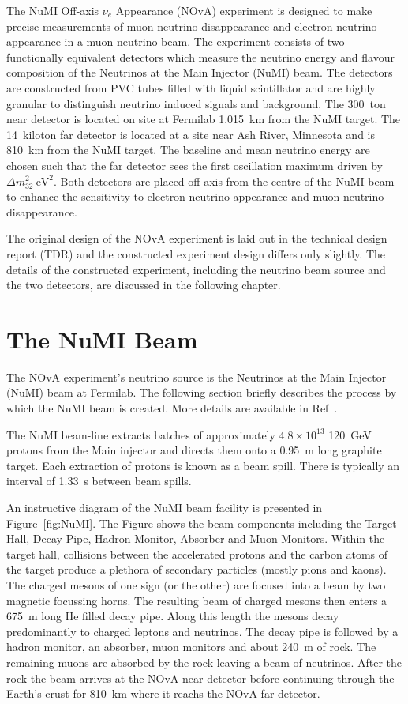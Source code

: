 
The NuMI Off-axis $\nu_e$ Appearance (NOvA) experiment 
is designed to make precise measurements of muon neutrino
disappearance and electron neutrino appearance in a muon neutrino
beam.  
The experiment consists of two functionally equivalent
detectors which measure the neutrino energy and flavour composition of 
the Neutrinos at the Main Injector (NuMI) beam. 
The detectors are constructed from PVC tubes filled with liquid
scintillator and are highly granular to distinguish neutrino induced
signals and background.
The 300~ton near detector is located on site at Fermilab 1.015~km  
from the NuMI target. The 14~kiloton far detector is located at a site
near Ash River, Minnesota and is 810~km from the NuMI target. 
The baseline and mean neutrino energy are chosen such that the far
detector sees the first oscillation maximum driven by $\Delta
m_{32}^2~\text{eV}^2$. 
Both detectors are placed off-axis from the centre
of the NuMI beam to enhance the sensitivity to electron neutrino
appearance and muon neutrino disappearance.

The original design of the NOvA experiment is laid out in the
technical design report (TDR) \cite{TDR} and the constructed experiment
design differs only slightly. The details
of the constructed experiment, including the neutrino beam source and
the two detectors, are discussed in the following chapter.


\section{The NuMI Beam}

The NOvA experiment's neutrino source is the Neutrinos at
the Main Injector (NuMI) beam at Fermilab. The following section
briefly describes the process by which the NuMI beam is
created. More details are available in Ref~\cite{NuMI}.

The NuMI beam-line extracts batches of approximately $4.8 \times
10^{13}$ 120~GeV protons from the Main
injector and directs them onto a 0.95~m long graphite
target. Each extraction of protons is known as a beam spill. There is
typically an interval of 1.33~s between beam spills.

An instructive diagram of the NuMI beam facility is presented in
Figure~\ref{fig:NuMI}. The Figure shows the beam components including the 
Target Hall, Decay Pipe, Hadron Monitor, Absorber and Muon Monitors. 
Within the target hall, collisions between the accelerated protons and
the carbon atoms of the 
target produce a plethora of secondary particles (mostly pions and
kaons). The charged mesons of one sign (or the other) are focused into
a beam by two magnetic focussing horns. 
The resulting beam of charged mesons then enters a 675~m long He
filled decay pipe. Along this length the 
mesons decay predominantly to charged leptons and neutrinos. 
The decay pipe is followed by a hadron monitor, an absorber, muon
monitors and about 240~m of rock. 
The remaining
muons are absorbed by the rock leaving a beam of
neutrinos. After the rock the beam 
arrives at the NOvA near detector before continuing through the
Earth's crust for 810~km where it reachs the NOvA far detector.

